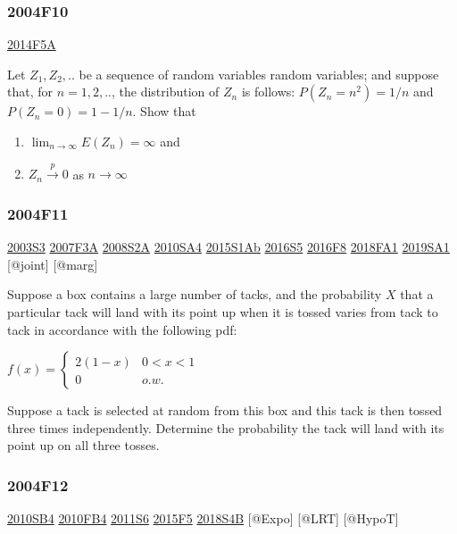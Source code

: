 \documentclass[6pt,Portrait]{article}
\begin{document}
\hypertarget{f10}{%
\subsubsection{2004F10}\label{f10}}

\protect\hyperlink{f5a-1}{2014F5A}

Let \(Z_1,Z_2,..\) be a sequence of random variables random variables;
and suppose that, for \(n=1,2,..\), the distribution of \(Z_n\) is
follows: \(P(Z_n=n^2)=1/n\) and \(P(Z_n=0)=1-1/n\). Show that

\begin{enumerate}
\def\labelenumi{(\alph{enumi})}
\item
  \(\lim_{n\to\infty}E(Z_n)=\infty\) and
\item
  \(Z_n\overset{p}\to0\) as \(n\to\infty\)
\end{enumerate}

\hypertarget{f11}{%
\subsubsection{2004F11}\label{f11}}

\protect\hyperlink{s3}{2003S3} \protect\hyperlink{f3a}{2007F3A}
\protect\hyperlink{s2a}{2008S2A} \protect\hyperlink{sa4-1}{2010SA4}
\protect\hyperlink{s1ab}{2015S1Ab} \protect\hyperlink{s5-4}{2016S5}
\protect\hyperlink{f8-4}{2016F8} \protect\hyperlink{fa1-4}{2018FA1}
\protect\hyperlink{sa1-3}{2019SA1} {[}@joint{]} {[}@marg{]}

Suppose a box contains a large number of tacks, and the probability
\(X\) that a particular tack will land with its point up when it is
tossed varies from tack to tack in accordance with the following pdf:

\(f(x)=\begin{cases}2(1-x)&0<x<1\\0& o.w.\end{cases}\)

Suppose a tack is selected at random from this box and this tack is then
tossed three times independently. Determine the probability the tack
will land with its point up on all three tosses.

\hypertarget{f12}{%
\subsubsection{2004F12}\label{f12}}

\protect\hyperlink{sb4}{2010SB4} \protect\hyperlink{fb4-1}{2010FB4}
\protect\hyperlink{s6-2}{2011S6} \protect\hyperlink{f5-5}{2015F5}
\protect\hyperlink{s4b-2}{2018S4B} {[}@Expo{]} {[}@LRT{]} {[}@HypoT{]}
\end{document}
